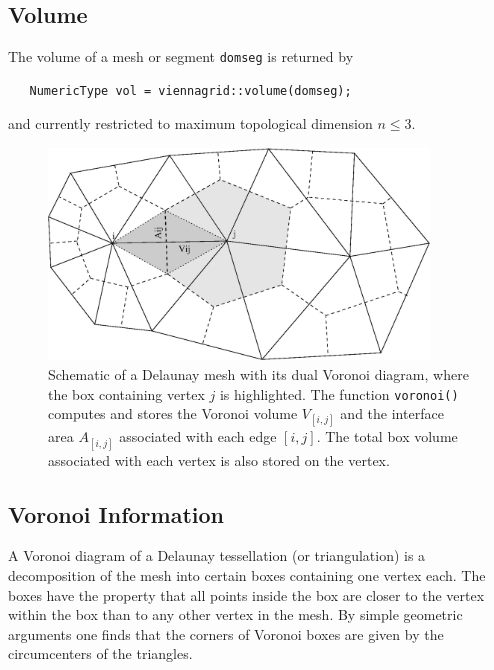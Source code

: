 
  \subsection{Volume}
  The volume of a mesh or segment \lstinline|domseg| is returned by
  \begin{lstlisting}
   NumericType vol = viennagrid::volume(domseg);
  \end{lstlisting}
  and currently restricted to maximum topological dimension $n \leq 3$.



\begin{figure}[tb]
\centering
 \includegraphics[width=0.9\textwidth]{figures/voronoi.eps}
 \caption{Schematic of a Delaunay mesh with its dual Voronoi diagram, where the box containing vertex $j$ is highlighted.
    The function \lstinline|voronoi()| computes and stores the Voronoi volume $V_{[i,j]}$ and the interface area $A_{[i,j]}$ associated with each edge $[i,j]$.
    The total box volume associated with each vertex is also stored on the vertex.}
 \label{fig:voronoi}
\end{figure}

 \subsection{Voronoi Information}
 A Voronoi diagram of a Delaunay tessellation (or triangulation) is a decomposition of the mesh into certain boxes containing one vertex each.
 The boxes have the property that all points inside the box are closer to the vertex within the box than to any other vertex in the mesh.
 By simple geometric arguments one finds that the corners of Voronoi boxes are given by the circumcenters of the triangles.

